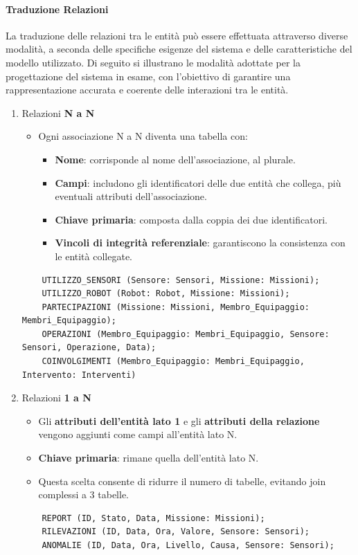 \paragraph{Traduzione Relazioni}
La traduzione delle relazioni tra le entità può essere effettuata attraverso diverse modalità, a seconda delle specifiche esigenze del sistema e delle caratteristiche del modello utilizzato. Di seguito si illustrano le modalità adottate per la progettazione del sistema in esame, con l'obiettivo di garantire una rappresentazione accurata e coerente delle interazioni tra le entità.
\begin{enumerate}
    \item Relazioni \textbf{N a N}
    \begin{itemize}
        \item Ogni associazione N a N diventa una tabella con:
        \begin{itemize}
            \item \textbf{Nome}: corrisponde al nome dell’associazione, al plurale.
            \item \textbf{Campi}: includono gli identificatori delle due entità che collega, più eventuali attributi dell’associazione.
            \item \textbf{Chiave primaria}: composta dalla coppia dei due identificatori.
            \item \textbf{Vincoli di integrità referenziale}: garantiscono la consistenza con le entità collegate.
        \end{itemize}
    \end{itemize}
    \begin{lstlisting}
    UTILIZZO_SENSORI (Sensore: Sensori, Missione: Missioni);
    UTILIZZO_ROBOT (Robot: Robot, Missione: Missioni);
    PARTECIPAZIONI (Missione: Missioni, Membro_Equipaggio: Membri_Equipaggio);
    OPERAZIONI (Membro_Equipaggio: Membri_Equipaggio, Sensore: Sensori, Operazione, Data);
    COINVOLGIMENTI (Membro_Equipaggio: Membri_Equipaggio, Intervento: Interventi)
    \end{lstlisting}

    \item Relazioni \textbf{1 a N}
    \begin{itemize}
        \item Gli \textbf{attributi dell’entità lato 1} e gli \textbf{attributi della relazione} vengono aggiunti come campi all’entità lato N.
        \item \textbf{Chiave primaria}: rimane quella dell’entità lato N.
        \item Questa scelta consente di ridurre il numero di tabelle, evitando join complessi a 3 tabelle.
    \end{itemize}
    \begin{lstlisting}
    REPORT (ID, Stato, Data, Missione: Missioni);
    RILEVAZIONI (ID, Data, Ora, Valore, Sensore: Sensori);
    ANOMALIE (ID, Data, Ora, Livello, Causa, Sensore: Sensori);
    \end{lstlisting}


\end{enumerate}
